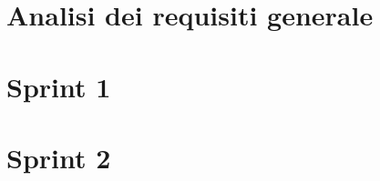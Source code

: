 \documentclass{llncs}           %
\newcommand{\labelsec}[1]{\label{sec:#1}}
\newcommand{\labelssec}[1]{\label{ssec:#1}}
\begin{document}
\section{Analisi dei requisiti generale}\labelsec{req_analysis}


\section{Sprint 1}\labelsec{sprint1}


\section{Sprint 2}\labelsec{sprint2}








\end{document}
